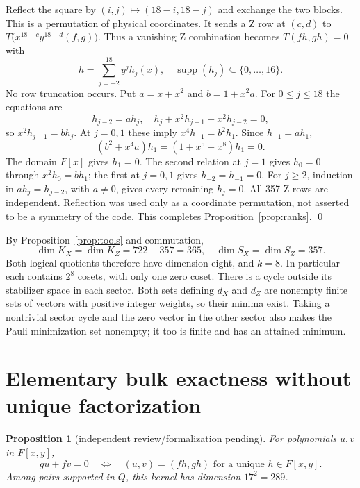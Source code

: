 \documentclass{article}
\newtheorem{proposition}{Proposition}
\DeclareMathOperator{\supp}{supp}
\begin{document}
Reflect the square by \((i,j) \mapsto (18 - i, 18 - j)\) and exchange the two blocks. This
is a permutation of physical coordinates. It sends a Z row at \((c,d)\) to
\(T\bigl(x^{18-c} y^{18-d} (f, g)\bigr)\). Thus a vanishing Z combination becomes
\(T(fh, gh) = 0\) with
\begin{equation}
  h = \sum_{j=-2}^{18} y^j h_j(x), \quad \supp(h_j) \subseteq \{0, \dots, 16\}.
\end{equation}
No row truncation occurs. Put \(a = x + x^2\) and \(b = 1 + x^2 a\). For
\(0 \le j \le 18\) the equations are
\begin{equation}
  h_{j-2} = a h_j, \quad
  h_j + x^2 h_{j-1} + x^2 h_{j-2} = 0,
\end{equation}
so \(x^2 h_{j-1} = b h_j\). At \(j = 0, 1\) these imply \(x^4 h_{-1} = b^2 h_1\). Since
\(h_{-1} = a h_1\),
\begin{equation}
  (b^2 + x^4 a) h_1 = (1 + x^5 + x^8) h_1 = 0.
\end{equation}
The domain \(F[x]\) gives \(h_1 = 0\). The second relation at \(j = 1\) gives \(h_0 = 0\)
through \(x^2 h_0 = b h_1\); the first at \(j = 0, 1\) gives \(h_{-2} = h_{-1} = 0\). For
\(j \ge 2\), induction in \(a h_j = h_{j-2}\), with \(a \ne 0\), gives every remaining
\(h_j = 0\). All 357 Z rows are independent. Reflection was used only as a coordinate
permutation, not asserted to be a symmetry of the code. This completes
Proposition~\ref{prop:ranks}. \qed

By Proposition~\ref{prop:tools} and commutation,
\begin{equation}
  \dim K_X = \dim K_Z = 722 - 357 = 365,
  \quad \dim S_X = \dim S_Z = 357.
\end{equation}
Both logical quotients therefore have dimension eight, and \(k = 8\). In particular each
contains \(2^8\) cosets, with only one zero coset. There is a cycle outside its stabilizer
space in each sector. Both sets defining \(d_X\) and \(d_Z\) are nonempty finite sets of
vectors with positive integer weights, so their minima exist. Taking a nontrivial sector
cycle and the zero vector in the other sector also makes the Pauli minimization set
nonempty; it too is finite and has an attained minimum.

\section{Elementary bulk exactness without unique factorization}\label{sec:exactness}

\begin{proposition}[independent review\slash formalization pending]\label{prop:exactness}
  For polynomials \(u, v\) in \(F[x,y]\),
  \begin{equation}
    gu + fv = 0 \quad \Longleftrightarrow \quad
    (u, v) = (fh, gh) \text{ for a unique } h \in F[x,y].
  \end{equation}
  Among pairs supported in \(Q\), this kernel has dimension \(17^2 = 289\).
\end{proposition}
\end{document}
